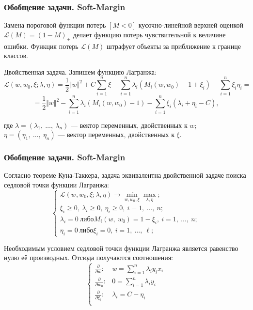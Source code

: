 \documentclass[11pt]{beamer}
\begin{document}
\begin{frame}
	\frametitle{Обобщение задачи. Soft-Margin}
	Замена пороговой функции потерь $[M<0]$ кусочно-линейной верхней оценкой
	$\mathcal{L}(M)=(1-M)_{+}$ делает функцию потерь чувствительной к величине ошибки. Функция потерь $\mathcal{L}(M)$ штрафует объекты за приближение к границе классов.
	
	Двойственная задача. Запишем функцию Лагранжа:
	$$
	\mathcal{L}(w, w_{0}, \xi;\lambda, \eta)=\frac{1}{2}\Vert w\Vert^{2}+C \sum_{i=1}^{n} \xi-\sum_{i=1}^{n}\lambda_{i}(M_{i}(w,w_{0})-1+\xi_{i})-\sum_{i=1}^{n} \xi_{i}\eta_i=
	$$
	$$
	=\frac{1}{2}\Vert w\Vert^{2}-\sum_{i=1}^{n}\lambda_{i}(M_{i}(w,w_{0})-1)-\sum_{i=1}^{n}\xi_{i}(\lambda_{i}+\eta_{i}-C),
	$$
	
	где $\lambda=(\lambda_{1},\ \ldots,\ \lambda_{n})$ --- вектор переменных, двойственных к $w$; $\eta=(\eta_{1},\ \ldots,\ \eta_{n})$ --- вектор
	переменных, двойственных к $\xi$.


\end{frame}

\begin{frame}
	\frametitle{Обобщение задачи. Soft-Margin}
Согласно теореме Куна-Таккера, задача эквивалентна двойственной задаче поиска седловой точки функции Лагранжа:
$$
\begin{cases}
	\mathcal{L}(w, w_{0}, \xi;\lambda,\eta)\rightarrow \underset{w,w_{0},\xi} \min  \underset{\lambda,\eta} \max; \\
	\xi_{i}\geq 0,\ \lambda_{i}\geq 0,\ \eta_{i}\geq 0,\ i=1,\ \ldots,\ n;\\
	\lambda_{i}=0\ либо M_{i}(w,\ w_{0})=1-\xi_{i},\ i=1,\ \ldots,\ n;\\
	\eta_{i}=0\ либо \xi_{i}=0,\ i=1,\ \ldots,\ \ell;
\end{cases}
$$

Необходимым условием седловой точки функции Лагранжа является равенство
нулю её производных. Отсюда получаются соотношения:
$$
\begin{cases}
	\frac{\partial}{\partial w}: & w = \sum\limits_{i=1}^{n}\lambda_i y_i x_i \\
	\frac{\partial}{\partial w_0}: & 0=\sum\limits_{i=1}^{n}\lambda_i y_i \\
	\frac{\partial}{\partial \xi_i}: & \lambda_i=C-\eta_i \\
\end{cases}
$$
	
\end{frame}
\end{document}
